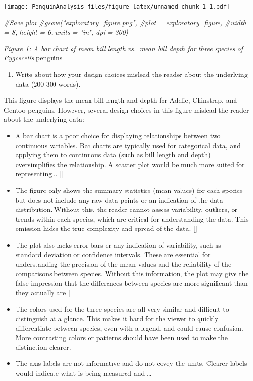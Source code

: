 \documentclass[
]{article}
\newenvironment{Shaded}{\begin{snugshade}}{\end{snugshade}}
\newcommand{\CommentTok}[1]{\textcolor[rgb]{0.56,0.35,0.01}{\textit{#1}}}
\providecommand{\tightlist}{%
  \setlength{\itemsep}{0pt}\setlength{\parskip}{0pt}}
\begin{document}
\texttt{[image: PenguinAnalysis\_files/figure-latex/unnamed-chunk-1-1.pdf]}

\begin{Shaded}
\begin{Highlighting}[]
\CommentTok{\#Save plot }
\CommentTok{\#gsave("exploratory\_figure.png", }
       \CommentTok{\#plot = exploratory\_figure, }
       \CommentTok{\#width = 8, height = 6, units = "in", dpi = 300) }
\end{Highlighting}
\end{Shaded}

\emph{Figure 1: A bar chart of mean bill length vs.~mean bill depth for
three species of Pygoscelis} penguins

\begin{enumerate}
\def\labelenumi{\alph{enumi})}
\setcounter{enumi}{1}
\tightlist
\item
  Write about how your design choices mislead the reader about the
  underlying data (200-300 words).
\end{enumerate}

This figure displays the mean bill length and depth for Adelie,
Chinstrap, and Gentoo penguins. However, several design choices in this
figure mislead the reader about the underlying data:

\begin{itemize}
\item
  A bar chart is a poor choice for displaying relationships between two
  continuous variables. Bar charts are typically used for categorical
  data, and applying them to continuous data (such as bill length and
  depth) oversimplifies the relationship. A scatter plot would be much
  more suited for representing .. {[}{]}
\item
  The figure only shows the summary statistics (mean values) for each
  species but does not include any raw data points or an indication of
  the data distribution. Without this, the reader cannot assess
  variability, outliers, or trends within each species, which are
  critical for understanding the data. This omission hides the true
  complexity and spread of the data. {[}{]}
\item
  The plot also lacks error bars or any indication of variability, such
  as standard deviation or confidence intervals. These are essential for
  understanding the precision of the mean values and the reliability of
  the comparisons between species. Without this information, the plot
  may give the false impression that the differences between species are
  more significant than they actually are {[}{]}
\item
  The colors used for the three species are all very similar and
  difficult to distinguish at a glance. This makes it hard for the
  viewer to quickly differentiate between species, even with a legend,
  and could cause confusion. More contrasting colors or patterns should
  have been used to make the distinction clearer.
\item
  The axis labels are not informative and do not covey the units.
  Clearer labels would indicate what is being measured and \ldots{}
\end{itemize}
\end{document}
